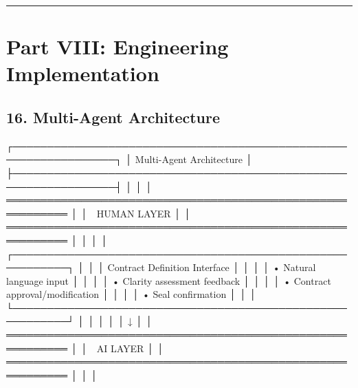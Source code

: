 \documentclass[
]{article}
\newenvironment{Shaded}{}{}
\newcommand{\NormalTok}[1]{#1}
\begin{document}
\begin{center}\rule{0.5\linewidth}{0.5pt}\end{center}

\hypertarget{part-viii-engineering-implementation}{%
\section{Part VIII: Engineering
Implementation}\label{part-viii-engineering-implementation}}

\hypertarget{16-multi-agent-architecture}{%
\subsection{16. Multi-Agent
Architecture}\label{16-multi-agent-architecture}}

\begin{Shaded}
\begin{Highlighting}[]
\NormalTok{┌─────────────────────────────────────────────────────────────────┐}
\NormalTok{│                    Multi{-}Agent Architecture                      │}
\NormalTok{├─────────────────────────────────────────────────────────────────┤}
\NormalTok{│                                                                  │}
\NormalTok{│  ═══════════════════════════════════════════════════════════    │}
\NormalTok{│                     👤 HUMAN LAYER                               │}
\NormalTok{│  ═══════════════════════════════════════════════════════════    │}
\NormalTok{│                                                                  │}
\NormalTok{│  ┌──────────────────────────────────────────────────────────┐   │}
\NormalTok{│  │ Contract Definition Interface                            │   │}
\NormalTok{│  │ • Natural language input                                 │   │}
\NormalTok{│  │ • Clarity assessment feedback                            │   │}
\NormalTok{│  │ • Contract approval/modification                         │   │}
\NormalTok{│  │ • Seal confirmation                                      │   │}
\NormalTok{│  └──────────────────────────────────────────────────────────┘   │}
\NormalTok{│                              │                                   │}
\NormalTok{│                              ↓                                   │}
\NormalTok{│  ═══════════════════════════════════════════════════════════    │}
\NormalTok{│                      🤖 AI LAYER                                 │}
\NormalTok{│  ═══════════════════════════════════════════════════════════    │}
\NormalTok{│                                                                  │}

\end{Highlighting}
\end{Shaded}
\end{document}
